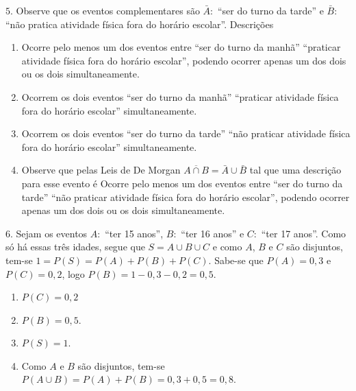 \(5.\)  Observe que os eventos complementares são \(\bar{A}:\) “ser do turno da tarde” e \(\bar{B}:\) “não pratica atividade física fora do horário escolar”. Descrições
\begin{enumerate}
\item {} 
Ocorre pelo menos um dos eventos entre “ser do turno da manhã”  “praticar atividade física fora do horário escolar”, podendo ocorrer apenas um dos dois ou os dois simultaneamente.

\item {} 
Ocorrem os dois eventos “ser do turno da manhã”  “praticar atividade física fora do horário escolar” simultaneamente.

\item {} 
Ocorrem os dois eventos “ser do turno da tarde”  “não praticar atividade física fora do horário escolar” simultaneamente.

\item {} 
Observe que pelas Leis de De Morgan \(\overline{A\cap B}=\bar{A}\cup \bar{B}\) tal que uma descrição para esse evento é Ocorre pelo menos um dos eventos entre “ser do turno da tarde”  “não praticar atividade física fora do horário escolar”, podendo ocorrer apenas um dos dois ou os dois simultaneamente.

\end{enumerate}

\(6.\) Sejam os eventos \(A:\) “ter 15 anos”, \(B:\) “ter 16 anos” e \(C:\) “ter 17 anos”. Como só há essas três idades, segue que \(S=A\cup B\cup C\) e como \(A\), \(B\) e \(C\)  são disjuntos, tem-se
\(1=P(S)=P(A)+P(B)+P(C)\). Sabe-se que \(P(A)=0,3\) e \(P(C)=0,2\), logo \(P(B)=1-0,3-0,2=0,5\).
\begin{enumerate}
\item {} 
\(P(C)=0,2\)

\item {} 
\(P(B)=0,5\).

\item {} 
\(P(S)=1\).

\item {} 
Como \(A\) e \(B\) são disjuntos, tem-se \(P(A\cup B)=P(A)+P(B)=0,3+0,5=0,8\).

\end{enumerate}

